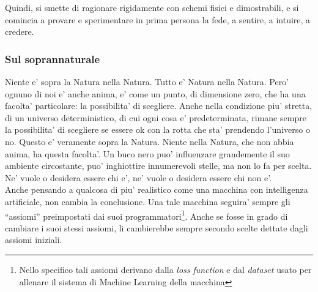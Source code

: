 Quindi, si smette di ragionare rigidamente con schemi fisici e dimostrabili, e si comincia a provare e sperimentare in prima persona la fede, a sentire, a intuire, a credere.

%

\subsubsection{Sul soprannaturale}
\label{SullaFedeSoprannaturale}
Niente e' sopra la Natura nella Natura. Tutto e' Natura nella Natura. Pero' ognuno di noi e' anche anima, e' come un punto, di dimensione zero, che ha una facolta' particolare: la possibilita' di scegliere. Anche nella condizione piu' stretta, di un universo deterministico, di cui ogni cosa e' predeterminata, rimane sempre la possibilita' di scegliere se essere ok con la rotta che sta' prendendo l'universo o no.  Questo e' veramente sopra la Natura. Niente nella Natura, che non abbia anima, ha questa facolta'. Un buco nero puo' influenzare grandemente il suo ambiente circostante, puo' inghiottire innumerevoli stelle, ma non lo fa per scelta. Ne' vuole o desidera essere chi e', ne' vuole o desidera essere chi non e'.\\
Anche pensando a qualcosa di piu' realistico come una macchina con intelligenza artificiale, non cambia la conclusione. Una tale macchina seguira' sempre gli ``assiomi'' preimpostati dai suoi programmatori\footnote{Nello specifico tali assiomi derivano dalla \emph{loss function} e dal \emph{dataset} usato per allenare il sistema di Machine Learning della macchina}. Anche se fosse in grado di cambiare i suoi stessi assiomi, li cambierebbe sempre secondo scelte dettate dagli assiomi iniziali.

